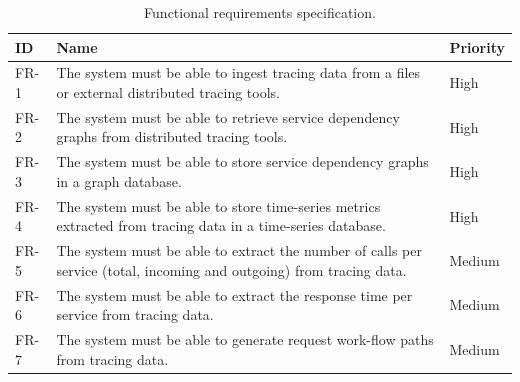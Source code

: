 \begin{table}[H]
    \caption{Functional requirements specification.}
    \label{table:functional_requirements_specification}
    \centering
    \begin{tabularx}{\linewidth} {
        |>{\hsize=0.10\hsize}X|
        >{\hsize=0.75\hsize}X|
        >{\hsize=0.15\hsize}X|}
        \cline{1-3}
        \textbf{ID}
         & \textbf{Name}
         & \textbf{Priority}                                                                                                    \\ \hline \hline
        FR-1
         & The system must be able to ingest tracing data from a files or external distributed tracing tools.
         & High                                                                                                                 \\ \hline
        FR-2
         & The system must be able to retrieve service dependency graphs from distributed tracing tools.
         & High                                                                                                                 \\ \hline
        FR-3
         & The system must be able to store service dependency graphs in a graph database.
         & High                                                                                                                 \\ \hline
        FR-4
         & The system must be able to store time-series metrics extracted from tracing data in a time-series database.
         & High                                                                                                                 \\ \hline
        FR-5
         & The system must be able to extract the number of calls per service (total, incoming and outgoing) from tracing data.
         & Medium                                                                                                               \\ \hline
        FR-6
         & The system must be able to extract the response time per service from tracing data.
         & Medium                                                                                                               \\ \hline
        FR-7
         & The system must be able to generate request work-flow paths from tracing data.
         & Medium                                                                                                               \\ \hline

\end{tabularx}
\end{table}
